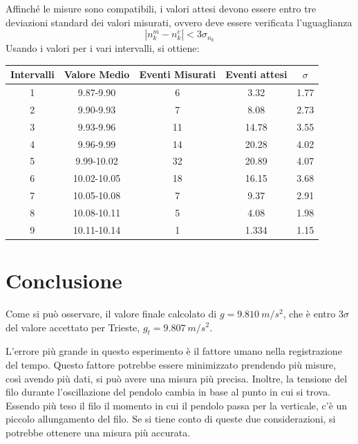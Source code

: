 \documentclass[a4paper]{article}
\begin{document}
Affinché le misure sono compatibili, i valori attesi devono essere entro tre deviazioni standard dei valori misurati, ovvero deve essere verificata l'uguaglianza 
\begin{equation}
    |n^m_k - n^c_k| < 3\sigma_{n_k}
\end{equation}
Usando i valori per i vari intervalli, si ottiene: 
\begin{center}
\begin{tabular}{|c|c|c|c|c|}
\hline
Intervalli & Valore Medio & Eventi Misurati & Eventi attesi & $\sigma$ \\ 
\hline
1          & 9.87-9.90    & 6               & 3.32          & 1.77                \\ 
2          & 9.90-9.93    & 7               & 8.08          & 2.73                \\ 
3          & 9.93-9.96    & 11              & 14.78         & 3.55                \\ 
4          & 9.96-9.99    & 14              & 20.28         & 4.02                \\ 
5          & 9.99-10.02   & 32              & 20.89         & 4.07                \\ 
6          & 10.02-10.05  & 18              & 16.15         & 3.68                \\ 
7          & 10.05-10.08  & 7               & 9.37          & 2.91                \\ 
8          & 10.08-10.11  & 5               & 4.08          & 1.98                \\ 
9          & 10.11-10.14  & 1               & 1.334         & 1.15                \\ \hline
\end{tabular}
\end{center}

\section{Conclusione}
Come si può osservare, il valore finale calcolato di $g=\SI{9.810}{m/s^2}$, che è entro $3\sigma$ del valore accettato per Trieste, $g_t=\SI{9.807}{m/s^2}$. 

L'errore più grande in questo esperimento è il fattore umano nella registrazione del tempo. Questo fattore potrebbe essere minimizzato prendendo più misure, così avendo più dati, si può avere una misura più precisa. Inoltre, la tensione del filo durante l'oscillazione del pendolo cambia in base al punto in cui si trova. Essendo più teso il filo il momento in cui il pendolo passa per la verticale, c'è un piccolo allungamento del filo. Se si tiene conto di queste due considerazioni, si potrebbe ottenere una misura più accurata. 
\end{document}
